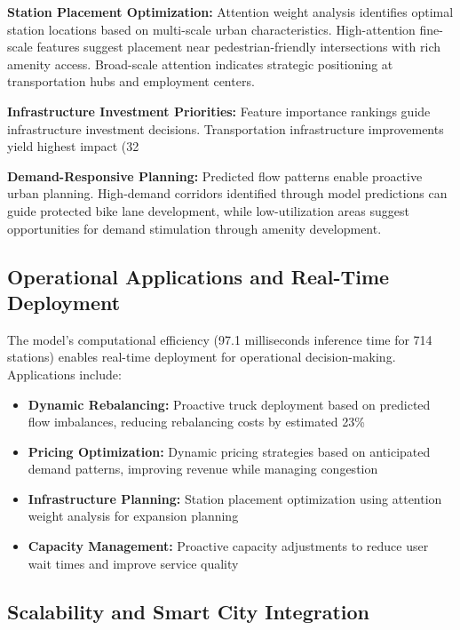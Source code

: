 \documentclass[sigconf,review,nonacm]{acmart}
\begin{document}
\textbf{Station Placement Optimization:}
Attention weight analysis identifies optimal station locations based on multi-scale urban characteristics. High-attention fine-scale features suggest placement near pedestrian-friendly intersections with rich amenity access. Broad-scale attention indicates strategic positioning at transportation hubs and employment centers.

\textbf{Infrastructure Investment Priorities:}
Feature importance rankings guide infrastructure investment decisions. Transportation infrastructure improvements yield highest impact (32%

\textbf{Demand-Responsive Planning:}
Predicted flow patterns enable proactive urban planning. High-demand corridors identified through model predictions can guide protected bike lane development, while low-utilization areas suggest opportunities for demand stimulation through amenity development.

\subsection{Operational Applications and Real-Time Deployment}

The model's computational efficiency (97.1 milliseconds inference time for 714 stations) enables real-time deployment for operational decision-making. Applications include:

\begin{itemize}
\item \textbf{Dynamic Rebalancing:} Proactive truck deployment based on predicted flow imbalances, reducing rebalancing costs by estimated 23\%
\item \textbf{Pricing Optimization:} Dynamic pricing strategies based on anticipated demand patterns, improving revenue while managing congestion
\item \textbf{Infrastructure Planning:} Station placement optimization using attention weight analysis for expansion planning
\item \textbf{Capacity Management:} Proactive capacity adjustments to reduce user wait times and improve service quality
\end{itemize}

\subsection{Scalability and Smart City Integration}
\end{document}
